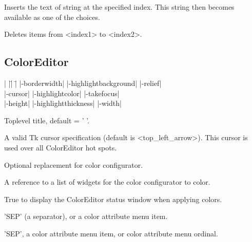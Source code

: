 \vskip5pt

\begin{enum}{1cm}

Inserts the text of string at the specified index. This string then becomes available as one of the choices. 

Deletes items from <index1> to <index2>. 

\end{enum}

\subsection*{ColorEditor}
\vspace{-4pt}

\begin{tabbing}
|                   |\=|                     |\= \kill
|-borderwidth| \> |-highlightbackground|     \> |-relief| \\   
|-cursor|      \> |-highlightcolor|          \> |-takefocus| \\
|-height|      \> |-highlightthickness|      \> |-width| \\
\end{tabbing}

\vskip5pt

\begin{enum}{1cm}

Toplevel title, default = ' '.

A valid Tk cursor specification (default is <top\_left\_arrow>).  This cursor is used over all ColorEditor
hot spots.

Optional replacement for  color configurator.

A reference to a list of widgets for the color configurator to color.

True to display the ColorEditor status window when applying colors.

'SEP' (a separator), or a color attribute menu item.

'SEP', a color attribute menu item, or color attribute menu ordinal.

\end{enum}

